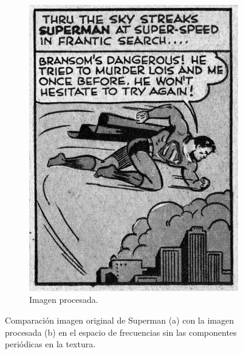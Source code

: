 \documentclass[letterpaper,12pt]{article}
\theoremstyle{plain}
\begin{document}
\begin{figure}[h]
\begin{subfigure}[h]{0.49\linewidth}
            \includegraphics[width=\textwidth]{Figuras/Inverse FFT of superman_process.png}
            \caption{Imagen procesada.}
         \end{subfigure}
    \caption{Comparación imagen original de Superman (a) con la imagen procesada (b) en el espacio de frecuencias sin las componentes periódicas en la textura.}
    \label{fig:superman}
\end{figure}
\end{document}
